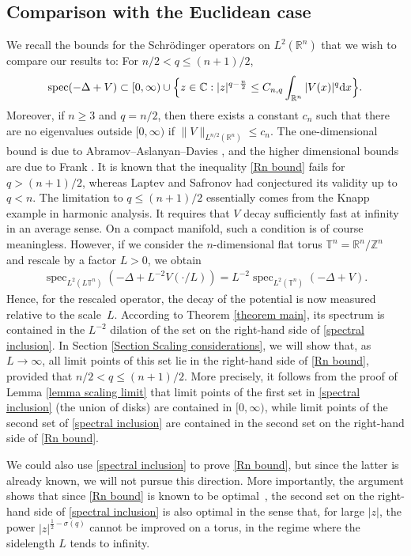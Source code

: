 \documentclass[12pt]{amsart}
\newcommand{\rd}{{\rm d}}
\newcommand{\R}{{\mathbb R}}
\newcommand{\C}{{\mathbb C}}
\newcommand{\Z}{{\mathbb Z}}
\DeclareMathOperator{\spec}{spec}
\begin{document}
\subsection{Comparison with the Euclidean case}
 We recall the bounds for the Schr\"odinger operators on $L^2(\R^n)$ that we wish to compare our results to: For $n/2<q\leq (n+1)/2$, 
\begin{align}\label{Rn bound}
    \spec(-\Delta+V)\subset [0,\infty)\cup \Big\{z\in\C:|z|^{q-\frac{n}{2}}\leq C_{n,q}\int_{\R^n}|V(x)|^{q}\rd x\Big\}.
\end{align}      
Moreover, if $n\geq 3$ and $q=n/2$, then there exists a constant $c_{n}$ such that there are no eigenvalues outside $[0,\infty)$ if $\|V\|_{L^{n/2}(\R^n)}\leq c_n$.
The one-dimensional bound is due to Abramov--Aslanyan--Davies \cite{MR1819914}, and the higher dimensional bounds are due to Frank \cite{MR2820160}. It is known \cite{MR4561804} that the inequality \eqref{Rn bound} fails for $q>(n+1)/2$, whereas Laptev and Safronov \cite{MR2540070} had conjectured its validity up to $q<n$. The limitation to $q\leq (n+1)/2$ essentially comes from the Knapp example in harmonic analysis. It requires that $V$ decay sufficiently fast at infinity in an average sense. On a compact manifold, such a condition is of course meaningless. 
However, if we consider the $n$-dimensional flat torus $\mathbb{T}^n=\R^n/\Z^n$ and rescale by a factor $L>0$, we obtain
\begin{align}\label{spectra scaled}
    \spec_{L^2(L\mathbb{T}^n)}(-\Delta+L^{-2}V(\cdot/L))=L^{-2}\spec_{L^2(\mathbb{T}^n)}(-\Delta+V).
\end{align} 
Hence, for the rescaled operator, the decay of the potential is now measured relative to the scale~$L$. According to Theorem \ref{theorem main}, its spectrum is contained in the $L^{-2}$ dilation of the set on the right-hand side of \eqref{spectral inclusion}. In Section \ref{Section Scaling considerations}, we will show that, as $L\to\infty$, all limit points of this set lie in the right-hand side of \eqref{Rn bound}, provided that $n/2<q\leq (n+1)/2$. More precisely, it follows from the proof of Lemma \ref{lemma scaling limit} that limit points of the first set in \eqref{spectral inclusion} (the union of disks) are contained in $[0,\infty)$, while limit points of the second set of \eqref{spectral inclusion} are contained in the second set on the right-hand side of \eqref{Rn bound}. 

We could also use \eqref{spectral inclusion} to prove \eqref{Rn bound}, but since the latter is already known, we will not pursue this direction. More importantly, the argument shows that since \eqref{Rn bound} is known to be optimal~\cite{MR4561804}, the second set on the right-hand side of \eqref{spectral inclusion} is also optimal in the sense that, for large $|z|$, the power $|z|^{\frac{1}{2}-\sigma(q)}$ cannot be improved on a torus, in the regime where the sidelength $L$ tends to infinity. 
\end{document}
